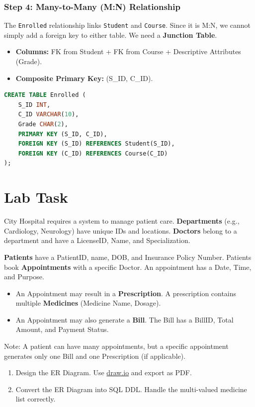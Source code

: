 \documentclass[12pt,a4paper]{article}
\begin{document}
\subsubsection{Step 4: Many-to-Many (M:N) Relationship}
The \texttt{Enrolled} relationship links \texttt{Student} and \texttt{Course}. Since it is M:N, we cannot simply add a foreign key to either table. We need a \textbf{Junction Table}.
\begin{itemize}
    \item \textbf{Columns:} FK from Student + FK from Course + Descriptive Attributes (Grade).
    \item \textbf{Composite Primary Key:} (S\_ID, C\_ID).
\end{itemize}
\begin{lstlisting}[language=SQL]
CREATE TABLE Enrolled (
    S_ID INT,
    C_ID VARCHAR(10),
    Grade CHAR(2),
    PRIMARY KEY (S_ID, C_ID),
    FOREIGN KEY (S_ID) REFERENCES Student(S_ID),
    FOREIGN KEY (C_ID) REFERENCES Course(C_ID)
);
\end{lstlisting}
\newpage

\section{Lab Task}
City Hospital requires a system to manage patient care.
\textbf{Departments} (e.g., Cardiology, Neurology) have unique IDs and locations. \textbf{Doctors} belong to a department and have a LicenseID, Name, and Specialization.

\textbf{Patients} have a PatientID, name, DOB, and Insurance Policy Number.
Patients book \textbf{Appointments} with a specific Doctor. An appointment has a Date, Time, and Purpose.
\begin{itemize}
    \item An Appointment may result in a \textbf{Prescription}. A prescription contains multiple \textbf{Medicines} (Medicine Name, Dosage).
    \item An Appointment may also generate a \textbf{Bill}. The Bill has a BillID, Total Amount, and Payment Status.
\end{itemize}
Note: A patient can have many appointments, but a specific appointment generates only one Bill and one Prescription (if applicable).

\begin{enumerate}
    \item Design the ER Diagram. 
    Use \href{https://www.draw.io}{draw.io} and export as PDF.
    \item Convert the ER Diagram into SQL DDL. Handle the multi-valued medicine list correctly.
\end{enumerate}
\end{document}
